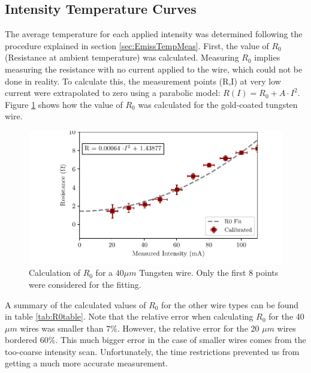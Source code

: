 \subsection{Intensity Temperature Curves}
\label{sec:IntTemp}

The average temperature for each applied intensity was determined following the procedure explained in section \ref{sec:EmissTempMeas}. First, the value of $R_0$ (Resistance at ambient temperature) was calculated. Measuring $R_0$ implies measuring the resistance with no current applied to the wire, which could not be done in reality. To calculate this, the measurement points (R,I) at very low current were extrapolated to zero using a parabolic model: $R(I) = R_{0} + A\cdot I^2$. Figure \ref{fig:R0Calc} shows how the value of $R_0$ was calculated for the gold-coated tungsten wire. 

\begin{figure}[h!]
    \centering
    \includegraphics[width=\columnwidth]{Figure_CalculateR0/CalcR0.pdf}
    \caption{Calculation of $R_0$ for a $40 \mu m$ Tungsten wire. Only the first 8 points were considered for the fitting. }
    \label{fig:R0Calc}
\end{figure}

A summary of the calculated values of $R_0$ for the other wire types can be found in table \ref{tab:R0table}. Note that the relative error when calculating $R_0$ for the 40 $\mu m$ wires was smaller than $7\%$. However, the relative error for the 20 $\mu m$ wires bordered $60 \%$. This much bigger error in the case of smaller wires comes from the too-coarse intensity scan. Unfortunately, the time restrictions prevented us from getting a much more accurate measurement. 

